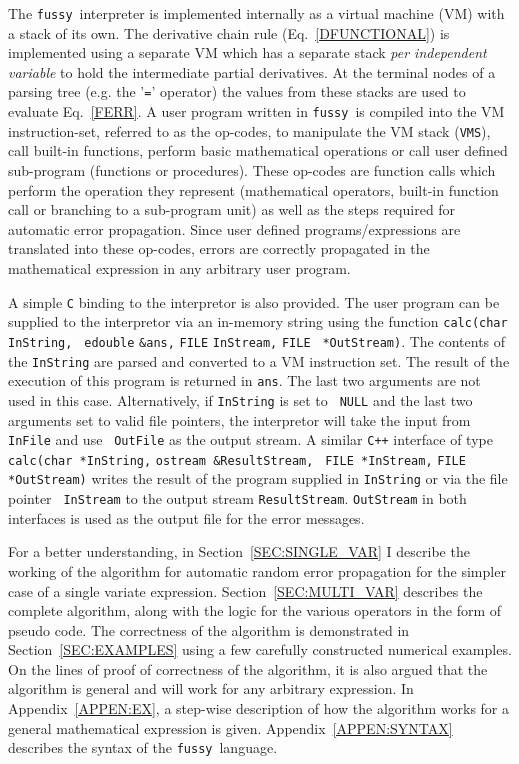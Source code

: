\documentclass[acmtoms,acmnow]{acmtrans2m}
\newcommand{\Fussy}{{\tt fussy}}
\newcommand{\VMS}{{\tt VMS}}
\begin{document}
The \Fussy\ interpreter is implemented internally as a virtual machine
(VM) with a stack of its own.  The derivative chain rule
(Eq.~\ref{DFUNCTIONAL}) is implemented using a separate VM which has a
separate stack {\it per independent variable} to hold the intermediate
partial derivatives.  At the terminal nodes of a parsing tree (e.g.
the '{\tt =}' operator) the values from these stacks are used to
evaluate Eq.~\ref{FERR}.  A user program written in \Fussy\ is
compiled into the VM instruction-set, referred to as the op-codes, to
manipulate the VM stack (\VMS), call built-in functions, perform basic
mathematical operations or call user defined sub-program (functions or
procedures).  These op-codes are function calls which perform the
operation they represent (mathematical operators, built-in function
call or branching to a sub-program unit) as well as the steps required
for automatic error propagation.  Since user defined
programs/expressions are translated into these op-codes, errors are
correctly propagated in the mathematical expression in any arbitrary
user program.

A simple {\tt C} binding to the interpretor is also provided.  The
user program can be supplied to the interpretor via an in-memory
string using the function {\tt calc(char} {\tt *InString,} {\tt
edouble} {\tt \&ans,} {\tt FILE} {\tt *InStream,} {\tt FILE} {\tt
*OutStream)}.  The contents of the {\tt InString} are parsed and
converted to a VM instruction set.  The result of the execution of
this program is returned in {\tt ans}.  The last two arguments are not
used in this case.  Alternatively, if {\tt InString} is set to {\tt
NULL} and the last two arguments set to valid file pointers, the
interpretor will take the input from {\tt InFile} and use {\tt
OutFile} as the output stream.  A similar {\tt C++} interface of type
{\tt calc(}{\tt char *InString,} {\tt ostream \&ResultStream,} {\tt
FILE *InStream,} {\tt FILE *OutStream)} writes the result of the
program supplied in {\tt InString} or via the file pointer {\tt
InStream} to the output stream {\tt ResultStream}.  {\tt OutStream} in
both interfaces is used as the output file for the error messages.

For a better understanding, in Section~\ref{SEC:SINGLE_VAR} I describe
the working of the algorithm for automatic random error propagation
for the simpler case of a single variate expression.
Section~\ref{SEC:MULTI_VAR} describes the complete algorithm, along
with the logic for the various operators in the form of pseudo code.
The correctness of the algorithm is demonstrated in
Section~\ref{SEC:EXAMPLES} using a few carefully constructed numerical
examples.  On the lines of proof of correctness of the algorithm, it
is also argued that the algorithm is general and will work for any
arbitrary expression.  In Appendix~\ref{APPEN:EX}, a step-wise
description of how the algorithm works for a general mathematical
expression is given.  Appendix~\ref{APPEN:SYNTAX} describes the syntax
of the \Fussy\ language.
\end{document}
